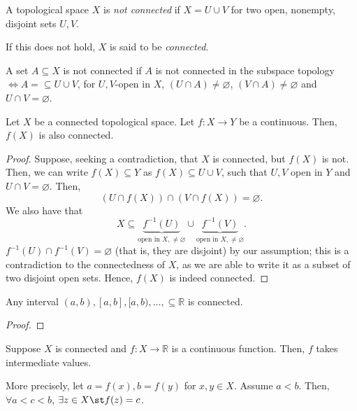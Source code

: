 \begin{definition}[Connected]
    A topological space $X$ is \emph{not connected} if $X = U \cup V$ for two open, nonempty, disjoint sets $U, V$. 
    
    If this does not hold, $X$ is said to be \emph{connected}.

    A set $A \subseteq X$ is not connected if $A$ is not connected in the subspace topology $\iff A =\subseteq U \cup V$, for $U, V$-open in $X$, $(U \cap A) \neq \varnothing$, $(V \cap A) \neq \varnothing$ and $U \cap V = \varnothing$.
\end{definition}

\begin{theorem}\label{thm:connectedcontinuousfunction}
    Let $X$ be a connected topological space. Let $f: X \to Y$ be a continuous. Then, $f(X)$ is also connected.
\end{theorem}

\begin{proof}
    Suppose, seeking a contradiction, that $X$ is connected, but $f(X)$ is not. Then, we can write $f(X) \subseteq Y$ as $f(X) \subseteq U \cup V$, such that $U, V$ open in $Y$ and $U \cap V = \varnothing$. Then, \[
    (U \cap f(X)) \cap (V \cap f(X)) = \varnothing.    
    \]
    We also have that $$X \subseteq \underbrace{f^{-1}(U)}_{\text{open in $X, \neq \varnothing$}} \cup \underbrace{f^{-1}(V)}_{\text{open in $X, \neq \varnothing$}}.$$
    $f^{-1}(U) \cap f^{-1}(V) = \varnothing$ (that is, they are disjoint) by our assumption; this is a contradiction to the connectedness of $X$, as we are able to write it as a subset of two disjoint open sets. Hence, $f(X)$ is indeed connected.
\end{proof}

\begin{lemma}\label{lemma:connectedinterval}
    Any interval $(a, b), [a, b], [a, b), \dots, \subseteq \mathbb{R}$ is connected.
\end{lemma}

\begin{proof}
\end{proof}

\begin{theorem}
    Suppose $X$ is connected and $f: X \to \mathbb{R}$ is a continuous function. Then, $f$ takes intermediate values.

    More precisely, let $a = f(x), b = f(y)$ for $x, y \in X$. Assume $a < b$. Then, $\forall a < c < b$, $\exists z \in X \st f(z) = c$.
\end{theorem}

